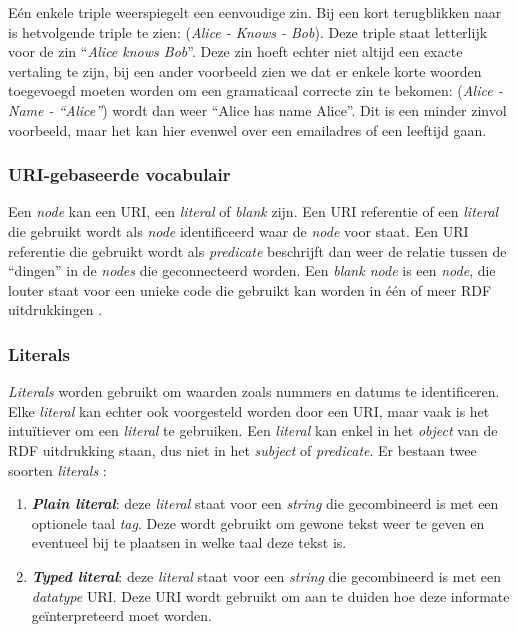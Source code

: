 Eén enkele triple weerspiegelt een eenvoudige zin. Bij een kort terugblikken naar  is hetvolgende triple te zien: (\textit{Alice - Knows - Bob}). Deze triple staat letterlijk voor de zin ``\textit{Alice knows Bob}''. Deze zin hoeft echter niet altijd een exacte vertaling te zijn, bij een ander voorbeeld zien we dat er enkele korte woorden toegevoegd moeten worden om een gramaticaal correcte zin te bekomen: (\textit{Alice - Name - ``Alice''}) wordt dan weer ``Alice has name Alice''. Dit is een minder zinvol voorbeeld, maar het kan hier evenwel over een emailadres of een leeftijd gaan.



\subsubsection{URI-gebaseerde vocabulair}
Een \textit{node} kan een URI, een \textit{literal} of \textit{blank} zijn. Een URI referentie of een \textit{literal} die gebruikt wordt als \textit{node} identificeerd waar de \textit{node} voor staat. Een URI referentie die gebruikt wordt als \textit{predicate} beschrijft dan weer de relatie tussen de ``dingen'' in de \textit{nodes} die geconnecteerd worden. Een \textit{blank node} is een \textit{node}, die louter staat voor een unieke code die gebruikt kan worden in één of meer RDF uitdrukkingen \cite{klyne2009resource}.



\subsubsection{Literals}
\textit{Literals} worden gebruikt om waarden zoals nummers en datums te identificeren. Elke \textit{literal} kan echter ook voorgesteld worden door een URI, maar vaak is het intuïtiever om een \textit{literal} te gebruiken. Een \textit{literal} kan enkel in het \textit{object} van de RDF uitdrukking staan, dus niet in het \textit{subject} of \textit{predicate}. Er bestaan twee soorten \textit{literals} \cite{klyne2009resource}:
\begin{enumerate}
    \item \textbf{\textit{Plain literal}}: deze \textit{literal} staat voor een \textit{string} die gecombineerd is met een optionele taal \textit{tag}. Deze wordt gebruikt om gewone tekst weer te geven en eventueel bij te plaatsen in welke taal deze tekst is.
    \item \textbf{\textit{Typed literal}}: deze \textit{literal} staat voor een \textit{string} die gecombineerd is met een \textit{datatype} URI. Deze URI wordt gebruikt om aan te duiden hoe deze informate geïnterpreteerd moet worden.
\end{enumerate}

